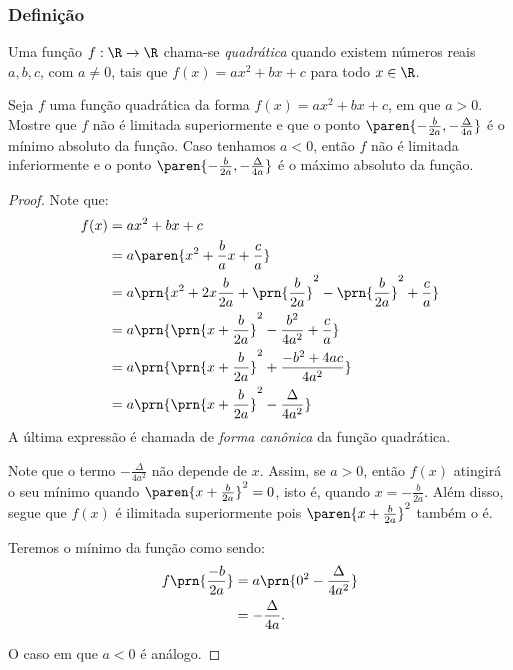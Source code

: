 \subsubsection{Definição}

\begin{definition}
Uma função $f: \R \to \R$ chama-se \emph{quadrática} quando existem
números reais $a, b, c$, com $a \neq 0$, tais que $f(x) = ax^2 +bx
+c$ para todo $x \in \R$.
\end{definition}

\begin{proposition}
Seja $f$ uma função quadrática da forma $f(x) = ax^2 + bx +c$, em que
$a >0$. Mostre que $f$ não é limitada superiormente e que o ponto
$\paren{-\frac {b} {2a}, -\frac {\Delta} {4a}}$ é o mínimo absoluto
da função. Caso tenhamos $a<0$, então $f$ não é limitada inferiormente e  o
ponto $\paren{-\frac {b} {2a}, -\frac {\Delta} {4a}}$ é o máximo
absoluto da função.
\end{proposition}

\begin{proof}
    Note que:
    \begin{align*}
        f(x) &= ax^2+bx+c\\
        &= a\paren{x^2 + \frac b a x + \frac c a} \\
        &= a\prn{x^2+2x\frac b {2a} + \prn{\frac b {2a}}^2  - \prn{\frac b {2a}}^2 + \frac c a} \\
        &= a\prn{\prn{x+\frac{b}{2a}}^2 - \frac{b^2}{4a^2}+\frac c a}\\
        &= a\prn{\prn{x+\frac{b}{2a}}^2 + \frac{-b^2+4ac}{4a^2}} \\
        &= a\prn{\prn{x+\frac{b}{2a}}^2 - \frac{\Delta}{4a^2}} \\
    \end{align*}
    \noindent A última expressão é chamada de \emph{forma canônica} da função quadrática.

    Note que o termo $-\frac{\Delta}{4a^2}$ não depende de $x$. 
    Assim, se $a>0$, então $f(x)$ atingirá o seu mínimo quando $\paren{x+\frac b {2a}}^2=0$, isto é, quando
    $x = -\frac b {2a}$. 
    Além disso, segue que $f(x)$ é ilimitada superiormente pois $\paren{x+\frac{b}{2a}}^2$ também o é.

    Teremos o mínimo da função como sendo:
    \begin{align*}
        f\prn{\frac{-b}{2a}} &= a\prn{0^2-\frac{\Delta}{4a^2}} \\ &= -\frac{\Delta}{4a}.
    \end{align*}

    O caso em que $a<0$ é análogo.
\end{proof}

